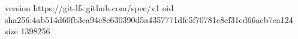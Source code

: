 version https://git-lfs.github.com/spec/v1
oid sha256:4ab514d60fb3ca94c8e630390d5a4357771dfe5f70781c8ef31ed66acb7ea124
size 1398256

